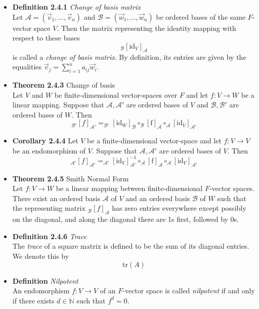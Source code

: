 \documentclass[11pt,a4paper]{article}
\begin{document}
\begin{itemize}

    \item \textbf{Definition 2.4.1} \emph{Change of basis matrix} \\
        Let $\mathcal{A} = (\vec{v}_1, \ldots, \vec{v}_n)$ and $\mathcal{B} =
        (\vec{w}_1, \ldots, \vec{w}_n)$
        be ordered bases of the same $F$-vector space $V$.
        Then the matrix representing the identity mapping with respect to these bases
        \[
            _\mathcal{B}{[\mathrm{id}_V]}_\mathcal{A}
        \]
        is called a \emph{change of basis matrix}.
        By definition, its entries are given by the equalities $\vec{v}_j =
        \sum_{i=1}^n a_{ij}\vec{w}_i$.

    \item \textbf{Theorem 2.4.3} Change of basis \\
        Let $V$ and $W$ be finite-dimensional vector-spaces over $F$ and let $f : V \to W$
        be a linear mapping.
        Suppose that $\mathcal{A, A'}$ are ordered bases of $V$ and $\mathcal{B, B'}$
        are ordered bases of $W$.
        Then
        \[
            _\mathcal{B'}{[f]}_\mathcal{A'} = _\mathcal{B'}{[\mathrm{id}_W]}_\mathcal{B}
            \circ _\mathcal{B}{[\mathrm{f}]}_\mathcal{A} \circ
            _\mathcal{A}{[\mathrm{id}_V]}_\mathcal{A'}
        \]

    \item \textbf{Corollary 2.4.4}
        Let $V$ be a finite-dimensional vector-space and let
        $f : V \to V$ be an endomorphism of $V$.
        Suppose that $\mathcal{A, A'}$ are ordered bases of $V$.
        Then
        \[
            _\mathcal{A'}{[f]}_\mathcal{A'} =
            _\mathcal{A'}{[\mathrm{id}_V]}^{-1}_\mathcal{A'}
            \circ _\mathcal{A}{[\mathrm{f}]}_\mathcal{A} \circ _\mathcal{A}
            {[\mathrm{id}_V]}_\mathcal{A'}
        \]

    \item \textbf{Theorem 2.4.5} Smith Normal Form \\
        Let $f : V \to W$ be a linear mapping between finite-dimensional $F$-vector spaces.
        There exist an ordered basis $\mathcal{A}$ of $V$ and an ordered basis
        $\mathcal{B}$ of $W$
        such that the representing matrix $_\mathcal{B}{[f]}_\mathcal{A}$
        has zero entries everywhere except possibly on the diagonal,
        and along the diagonal there are 1s first, followed by 0s.

    \item \textbf{Definition 2.4.6} \emph{Trace} \\
        The \emph{trace} of a square matrix is defined to be the sum of its diagonal
        entries.
        We denote this by
        \[
            \mathrm{tr}(A)
        \]

    \item \textbf{Definition} \emph{Nilpotent} \\
        An endomorphism $f : V \to V$ of an $F$-vector space is called \emph{nilpotent}
        if and only if there exists $d \in \mathbb{N}$ such that $f^d = 0$.

\end{itemize}
\end{document}
